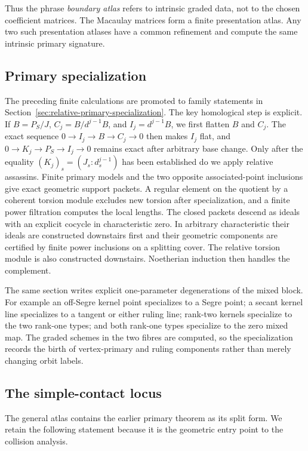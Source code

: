 Thus the phrase \emph{boundary atlas} refers to intrinsic graded
data, not to the chosen coefficient matrices.  The Macaulay matrices
form a finite presentation atlas.  Any two such presentation atlases
have a common refinement and compute the same intrinsic primary
signature.

\subsection{Primary specialization}

The preceding finite calculations are promoted to family statements
in Section~\ref{sec:relative-primary-specialization}.  The key
homological step is explicit.  If \(B=P_S/J\),
\(C_j=B/d^{j-1}B\), and \(I_j=d^{j-1}B\), we first flatten
\(B\) and \(C_j\).  The exact sequence
\(0\to I_j\to B\to C_j\to0\) then makes \(I_j\) flat, and
\(0\to K_j\to P_S\to I_j\to0\) remains exact after arbitrary
base change.  Only after the equality
\((K_j)_s=(J_s:d_s^{j-1})\) has been established do we apply
relative assassins.  Finite primary models and the two opposite associated-point inclusions
give exact geometric support packets.  A regular element on the quotient
by a coherent torsion module excludes new torsion after specialization,
and a finite power filtration computes the local lengths.  The
closed packets descend as ideals with an explicit cocycle in
characteristic zero.  In arbitrary characteristic their ideals are
constructed downstairs first and their geometric components are
certified by finite power inclusions on a splitting cover.  The
relative torsion module is also constructed downstairs.  Noetherian
induction then handles the complement.

The same section writes explicit one-parameter degenerations of the
mixed block.  For example an off-Segre kernel point specializes to a
Segre point; a secant kernel line specializes to a tangent or either
ruling line; rank-two kernels specialize to the two rank-one types;
and both rank-one types specialize to the zero mixed map.  The
graded schemes in the two fibres are computed, so the specialization
records the birth of vertex-primary and ruling components rather than
merely changing orbit labels.

\subsection{The simple-contact locus}

The general atlas contains the earlier primary theorem as its split
form.  We retain the following statement because it is the geometric
entry point to the collision analysis.

